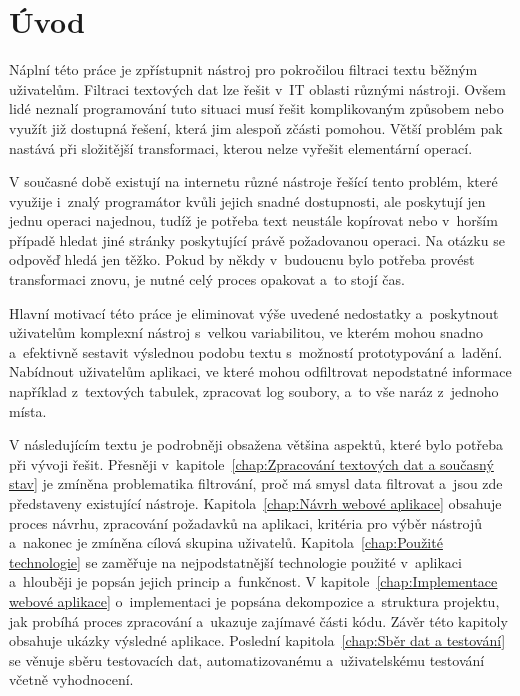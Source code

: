 \chapter{Úvod}
Náplní této práce je zpřístupnit nástroj pro pokročilou filtraci textu běžným uživatelům. Filtraci textových dat lze řešit v~IT oblasti různými nástroji. Ovšem lidé neznalí programování tuto situaci musí řešit komplikovaným způsobem nebo využít již dostupná řešení, která jim alespoň zčásti pomohou. Větší problém pak nastává při složitější transformaci, kterou nelze vyřešit elementární operací.

V současné době existují na internetu různé nástroje řešící tento problém, které využije i~znalý programátor kvůli jejich snadné dostupnosti, ale poskytují jen jednu operaci najednou, tudíž je potřeba text neustále kopírovat nebo v~horším případě hledat jiné stránky poskytující právě požadovanou operaci. Na otázku  se odpověď hledá jen těžko. Pokud by někdy v~budoucnu bylo potřeba provést transformaci znovu, je nutné celý proces opakovat a~to stojí čas.

Hlavní motivací této práce je eliminovat výše uvedené nedostatky a~poskytnout uživatelům komplexní nástroj s~velkou variabilitou, ve kterém mohou snadno a~efektivně sestavit výslednou podobu textu s~možností prototypování a~ladění. Nabídnout uživatelům aplikaci, ve které mohou odfiltrovat nepodstatné informace například z~textových tabulek, zpracovat log soubory, a~to vše naráz z~jednoho místa.

V následujícím textu je podrobněji obsažena většina aspektů, které bylo potřeba při vývoji řešit. Přesněji v~kapitole~\ref{chap:Zpracování textových dat a současný stav} je zmíněna problematika filtrování, proč má smysl data filtrovat a~jsou zde představeny existující nástroje. Kapitola~\ref{chap:Návrh webové aplikace} obsahuje proces návrhu, zpracování požadavků na aplikaci, kritéria pro výběr nástrojů a~nakonec je zmíněna cílová skupina uživatelů. Kapitola~\ref{chap:Použité technologie} se zaměřuje na nejpodstatnější technologie použité v~aplikaci a~hlouběji je popsán jejich princip a~funkčnost. V kapitole~\ref{chap:Implementace webové aplikace} o~implementaci je popsána dekompozice a~struktura projektu, jak probíhá proces zpracování a~ukazuje zajímavé části kódu. Závěr této kapitoly obsahuje ukázky výsledné aplikace. Poslední kapitola~\ref{chap:Sběr dat a testování} se věnuje sběru testovacích dat, automatizovanému a~uživatelskému testování včetně vyhodnocení.

